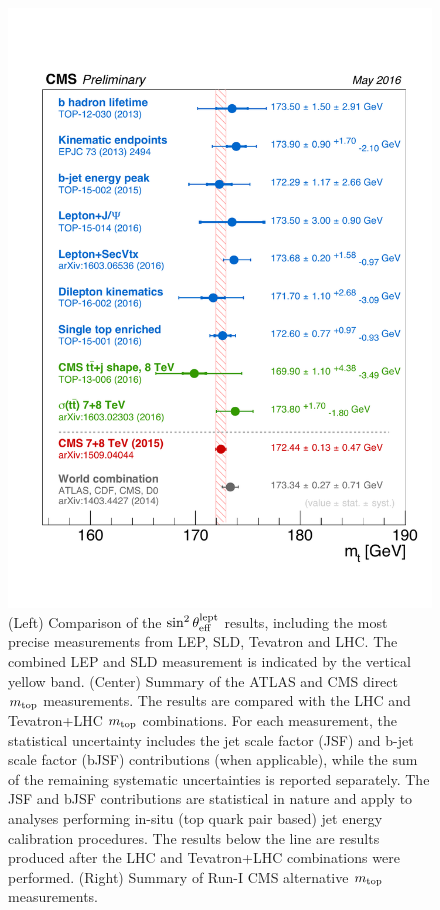 \documentclass{blois}
\begin{document}
\begin{figure}
\begin{minipage}{0.26\linewidth}
\centerline{\includegraphics[width=0.95\linewidth]{figures/mtopComb_alt1}}
\end{minipage}
\caption[]{(Left) Comparison of the $\sin^2\theta_{\rm eff}^{\rm lept}$ results, including
the most precise measurements from LEP, SLD, Tevatron and LHC. The combined LEP and
SLD measurement is indicated by the vertical yellow band.
(Center) Summary of the ATLAS and CMS direct $m_{\rm top}$ measurements. The
results are compared with the LHC and Tevatron+LHC $m_{\rm top}$ combinations.
For each measurement, the statistical uncertainty includes the jet scale factor
(JSF) and b-jet scale factor (bJSF) contributions (when applicable), while the
sum of the remaining systematic uncertainties is reported separately. The JSF
and bJSF contributions are statistical in nature and apply to analyses performing
in-situ (top quark pair based) jet energy calibration procedures. The results
below the line are results produced after the LHC and Tevatron+LHC combinations
were performed.
(Right) Summary of Run-I CMS alternative $m_{\rm top}$ measurements.}
\label{fig:theFigure}
\end{figure}
\end{document}
